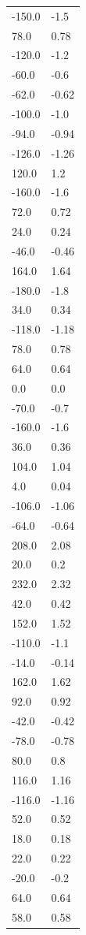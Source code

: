 \begin{longtable}{ll}
-150.0 & -1.5 \\
78.0 & 0.78 \\
-120.0 & -1.2 \\
-60.0 & -0.6 \\
-62.0 & -0.62 \\
-100.0 & -1.0 \\
-94.0 & -0.94 \\
-126.0 & -1.26 \\
120.0 & 1.2 \\
-160.0 & -1.6 \\
72.0 & 0.72 \\
24.0 & 0.24 \\
-46.0 & -0.46 \\
164.0 & 1.64 \\
-180.0 & -1.8 \\
34.0 & 0.34 \\
-118.0 & -1.18 \\
78.0 & 0.78 \\
64.0 & 0.64 \\
0.0 & 0.0 \\
-70.0 & -0.7 \\
-160.0 & -1.6 \\
36.0 & 0.36 \\
104.0 & 1.04 \\
4.0 & 0.04 \\
-106.0 & -1.06 \\
-64.0 & -0.64 \\
208.0 & 2.08 \\
20.0 & 0.2 \\
232.0 & 2.32 \\
42.0 & 0.42 \\
152.0 & 1.52 \\
-110.0 & -1.1 \\
-14.0 & -0.14 \\
162.0 & 1.62 \\
92.0 & 0.92 \\
-42.0 & -0.42 \\
-78.0 & -0.78 \\
80.0 & 0.8 \\
116.0 & 1.16 \\
-116.0 & -1.16 \\
52.0 & 0.52 \\
18.0 & 0.18 \\
22.0 & 0.22 \\
-20.0 & -0.2 \\
64.0 & 0.64 \\
58.0 & 0.58 \\

\end{longtable}
